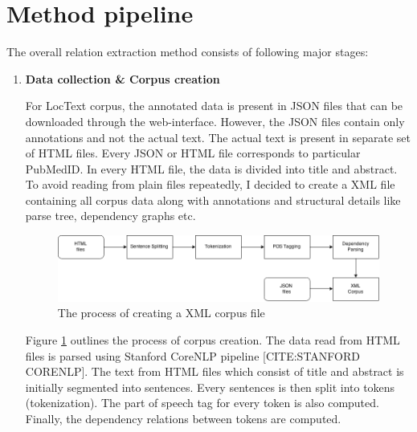 \section{Method pipeline}\label{sec:pipeline}




The overall relation extraction method consists of following major stages:

\begin{enumerate}

\item \textbf{Data collection \& Corpus creation}

For LocText corpus, the annotated data is present in JSON files that can be downloaded through the web-interface. However, the JSON files contain only annotations and not the actual text. The actual text is present in separate set of HTML files. Every JSON or HTML file corresponds to particular PubMedID. In every HTML file, the data is divided into title and abstract. To avoid reading from plain files repeatedly, I decided to create a XML file containing all corpus data along with annotations and structural details like parse tree, dependency graphs etc.

\begin{figure}
\centering
\includegraphics[scale=0.4]{figures/Corpus_Creation.png}
\caption{The process of creating a XML corpus file}\label{fig:corpusCreation}
\end{figure}

Figure \ref{fig:corpusCreation} outlines the process  of corpus creation. The data read from HTML files is parsed using Stanford CoreNLP pipeline [CITE:STANFORD CORENLP]. The text from HTML files which consist of title and abstract is initially segmented into sentences. Every sentences is then split into tokens (tokenization). The part of speech tag for every token is also computed. Finally, the dependency relations between tokens are computed.


\end{enumerate}
